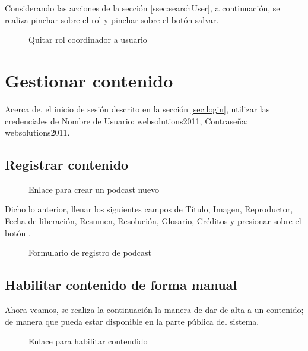 Considerando las acciones de la sección \ref{ssec:searchUser}, a continuación,
se realiza pinchar sobre el rol  y pinchar sobre el botón
salvar.

\begin{figure}[!ht]
\centering
		\caption{Quitar rol coordinador a usuario}
\end{figure}

\section{Gestionar contenido}

Acerca de, el inicio de sesión descrito en la sección \ref{sec:login}, utilizar
las credenciales de Nombre de Usuario: websolutions2011, Contraseña: websolutions2011.

\subsection{Registrar contenido}

\begin{figure}[!ht]
\centering
		\caption{Enlace para crear un podcast nuevo}
\end{figure}

Dicho lo anterior, llenar los siguientes campos de Título, Imagen, Reproductor,
Fecha de liberación, Resumen, Resolución, Glosario, Créditos y presionar sobre
el botón .

\begin{figure}[!ht]
\centering
		\caption{Formulario de registro de podcast}
\end{figure}

\subsection{Habilitar contenido de forma manual} \label{ssec:availableContent}

Ahora veamos, se realiza la continuación la manera de dar de alta a un contenido;
de manera que pueda estar disponible en la parte pública del sistema.

\begin{figure}[H]
\centering
		\caption{Enlace para habilitar contendido}
\end{figure}

